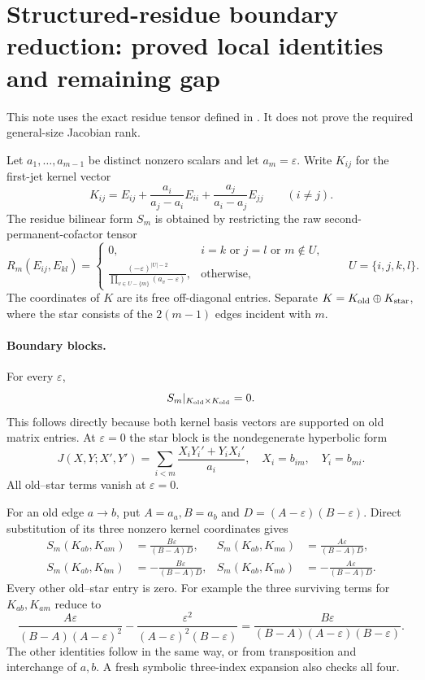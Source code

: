 \section*{Structured-residue boundary reduction: proved local identities and remaining gap}
This note uses the exact residue tensor defined in
.
It does not prove the required general-size Jacobian rank.

Let \(a_1,\ldots,a_{m-1}\) be distinct nonzero scalars and
let \(a_m=\varepsilon\). Write \(K_{ij}\) for the first-jet
kernel vector
\[
 K_{ij}=E_{ij}
       +\frac{a_i}{a_j-a_i}E_{ii}
       +\frac{a_j}{a_i-a_j}E_{jj}\qquad(i\ne j).
\]
The residue bilinear form \(S_m\) is obtained by restricting
the raw second-permanent-cofactor tensor
\[
 R_m(E_{ij},E_{kl})=
 \begin{cases}
 0,&i=k\text{ or }j=l\text{ or }m\notin U,\\
 \displaystyle\frac{(-\varepsilon)^{|U|-2}}
                   {\prod_{v\in U-\{m\}}(a_v-\varepsilon)},
       &\text{otherwise},
 \end{cases}
 \qquad U=\{i,j,k,l\}.
\]
The coordinates of \(K\) are its free off-diagonal entries.
Separate \(K=K_{\rm old}\oplus K_{\rm star}\), where the
star consists of the \(2(m-1)\) edges incident with \(m\).

\paragraph{Boundary blocks.}
For every \(\varepsilon\),
\[
                  S_m|_{K_{\rm old}\times K_{\rm old}}=0.
\]
This follows directly because both kernel basis vectors
are supported on old matrix entries. At \(\varepsilon=0\)
the star block is the nondegenerate hyperbolic form
\[
 J(X,Y;X',Y')=
     \sum_{i<m}\frac{X_iY_i'+Y_iX_i'}{a_i},
 \quad X_i=b_{im},\quad Y_i=b_{mi}.
\]
All old--star terms vanish at \(\varepsilon=0\).

For an old edge \(a\to b\), put \(A=a_a,B=a_b\) and
\(D=(A-\varepsilon)(B-\varepsilon)\). Direct substitution
of its three nonzero kernel coordinates gives
\[
 \begin{split}
 S_m(K_{ab},K_{am})&=\frac{B\varepsilon}{(B-A)D},&
 S_m(K_{ab},K_{ma})&=\frac{A\varepsilon}{(B-A)D},\\
 S_m(K_{ab},K_{bm})&=-\frac{B\varepsilon}{(B-A)D},&
 S_m(K_{ab},K_{mb})&=-\frac{A\varepsilon}{(B-A)D}.
 \end{split}
\]
Every other old--star entry is zero. For example the
three surviving terms for \(K_{ab},K_{am}\) reduce to
\[
 \frac{A\varepsilon}{(B-A)(A-\varepsilon)^2}
       -\frac{\varepsilon^2}{(A-\varepsilon)^2(B-\varepsilon)}
 =\frac{B\varepsilon}{(B-A)(A-\varepsilon)(B-\varepsilon)}.
\]
The other identities follow in the same way, or from
transposition and interchange of \(a,b\). A fresh
symbolic three-index expansion also checks all four.

